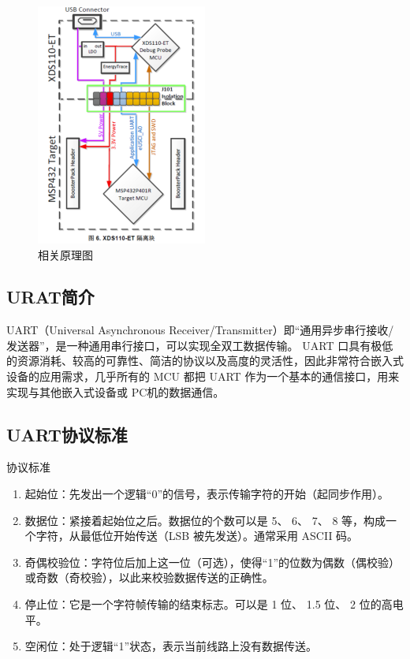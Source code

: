 \documentclass[a4paper,10pt,UTF8]{paper}
\numberwithin{equation}{section}
\numberwithin{figure}{section}
\begin{document}
\begin{figure}[h]
  \centering
  \includegraphics[width=0.5\textwidth]{img/2.PNG}
  \caption{相关原理图}
  \label{fig:2}
\end{figure}



\subsection{URAT简介}

UART（Universal Asynchronous Receiver/Transmitter）即“通用异步串行接收/发送器”，是一种通用串行接口，可以实现全双工数据传输。 UART 口具有极低的资源消耗、较高的可靠性、简洁的协议以及高度的灵活性，因此非常符合嵌入式设备的应用需求，几乎所有的 MCU 都把 UART 作为一个基本的通信接口，用来实现与其他嵌入式设备或 PC机的数据通信。

\subsection{UART协议标准}

协议标准

\begin{enumerate}
  \item 起始位：先发出一个逻辑“0”的信号，表示传输字符的开始（起同步作用）。
  \item 
  数据位：紧接着起始位之后。数据位的个数可以是 5、 6、 7、 8 等，构成一个字符，从最低位开始传送（LSB 被先发送）。通常采用 ASCII 码。
  \item 奇偶校验位：字符位后加上这一位（可选），使得“1”的位数为偶数（偶校验）或奇数（奇校验），以此来校验数据传送的正确性。
  \item 停止位：它是一个字符帧传输的结束标志。可以是 1 位、 1.5 位、 2 位的高电平。
  \item 空闲位：处于逻辑“1”状态，表示当前线路上没有数据传送。
\end{enumerate}
\end{document}
